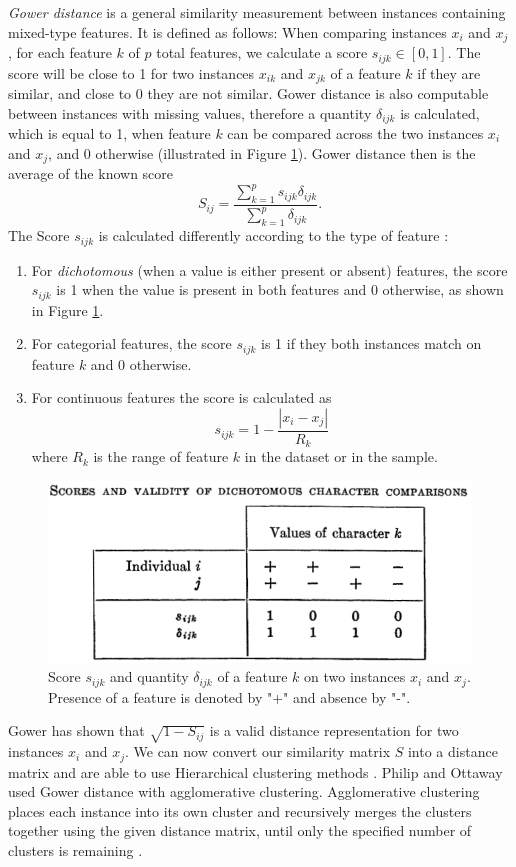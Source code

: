 \textit{Gower distance} \cite{gower} is a general similarity measurement between instances containing mixed-type features. It is defined as follows: When comparing instances $x_i$ and $x_j$, for each feature $k$ of $p$ total features, we calculate a score $s_{ijk} \in [0,1]$. The score will be close to 1 for two instances $x_{ik}$ and $x_{jk}$ of a feature $k$ if they are similar, and close to 0 they are not similar.
Gower distance is also computable between instances with missing values, therefore a quantity $\delta_{ijk}$ is calculated, which is equal to 1, when feature $k$ can be compared across the two instances $x_i$ and $x_j$, and 0 otherwise (illustrated in Figure \ref{gower_dichotomous}).
Gower distance then is the average of the known score
$$S_{ij} = \frac{\sum^p_{k=1}s_{ijk}\delta_{ijk}}{\sum^p_{k=1}\delta_{ijk}}.$$
The Score $s_{ijk}$ is calculated differently according to the type of feature \cite{gower}:
\begin{enumerate}
	\item For \textit{dichotomous} (when a value is either present or absent) features, the score $s_{ijk}$ is 1 when the value is present in both features and 0 otherwise, as shown in Figure \ref{gower_dichotomous}.
	\item For categorial features, the score $s_{ijk}$ is 1 if they both instances match on feature $k$ and 0 otherwise.
	\item For continuous features the score is calculated as
	$$s_{ijk} = 1-\frac{|x_i-x_j|}{R_k}$$
	where $R_k$ is the range of feature $k$ in the dataset or in the sample.
\end{enumerate}
\begin{figure}
	\includegraphics[width=\linewidth]{gower-dichotomous.png}
	\caption{Score $s_{ijk}$ and quantity $\delta_{ijk}$ of a feature $k$ on two instances $x_i$ and $x_j$. Presence of a feature is denoted by "+" and absence by "-". \cite{gower}}
	\label{gower_dichotomous}
\end{figure}
Gower \cite{gower} has shown that $\sqrt{1- S_{ij}}$ is a valid distance representation for two instances $x_i$ and $x_j$. We can now convert our similarity matrix $S$ into a distance matrix and are able to use Hierarchical clustering methods \cite{algorithms_for_clustering_data}. Philip and Ottaway \cite{philip_ottaway} used Gower distance with agglomerative clustering. Agglomerative clustering places each instance into its own cluster and recursively merges the clusters together using the given distance matrix, until only the specified number of clusters is remaining \cite{algorithms_for_clustering_data}.

